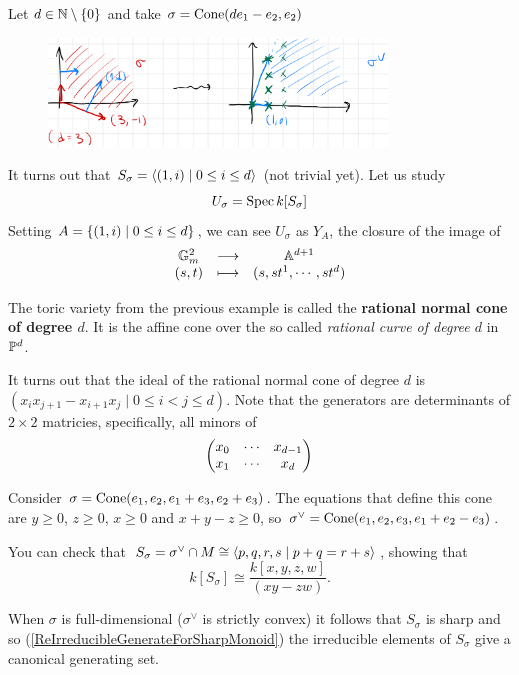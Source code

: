 \begin{example}
Let $d\in \mathbb{N}\setminus\{0\}$ and take $\sigma=\operatorname{Cone}(de_1-e_2,e_2)$

\begin{figure}[!htb]
	\centering
	\includegraphics[width=9cm]{Images/Rational-normal-cone-cone.png}
\end{figure}

\noindent
It turns out that $S_\sigma=\left\langle {(1,i)\mid 0\leq i\leq d}\right\rangle$ (not trivial yet). Let us study
\[U_\sigma=\operatorname{Spec} k[S_\sigma]\]
Setting $A=\left\{{(1,i)\mid 0\leq i\leq d}\right\}$, we can see $U_\sigma$ as $Y_A$, the closure of the image of
\[\begin{array}{ccc} {\mathbb{G}_m^2} & \longrightarrow & {\mathbb{A}^{d+1}}\\ {(s,t)} & \longmapsto & {(s,st^1,\cdots, st^d)} \end{array}\]
\end{example}

\begin{definition}
The toric variety from the previous example is called the \textbf{rational normal cone of degree $d$}. It is the affine cone over the so called \textit{rational curve of degree $d$} in $\mathbb{P}^d$.
\end{definition}

\begin{remark}
It turns out that the ideal of the rational normal cone of degree $d$ is $(x_ix_{j+1}-x_{i+1}x_j\mid 0\leq i<j\leq d)$. Note that the generators are determinants of $2\times 2$ matricies, specifically, all minors of
\[\begin{pmatrix}x_0 & \cdots & x_{d-1}\\ x_1 & \cdots & x_d\end{pmatrix}\]
\end{remark}

\begin{example}
Consider $\sigma=\operatorname{Cone}(e_1,e_2,e_1+e_3,e_2+e_3)$. The equations that define this cone are $y\geq 0$, $z\geq 0$, $x\geq 0$ and $x+y-z\geq 0$, so $\sigma^\vee=\operatorname{Cone}(e_1,e_2,e_3,e_1+e_2-e_3)$.

You can check that $S_\sigma=\sigma^\vee\cap M\cong\left\langle {p,q,r,s\mid p+q=r+s}\right\rangle$, showing that
\[k[S_\sigma]\cong \frac{k[x,y,z,w]}{(xy-zw)}.\]
\end{example}

\begin{remark}
When $\sigma$ is full-dimensional ($\sigma^\vee$ is strictly convex) it follows that $S_\sigma$ is sharp and so (\ref{ReIrreducibleGenerateForSharpMonoid}) the irreducible elements of $S_\sigma$ give a canonical generating set.
\end{remark}

